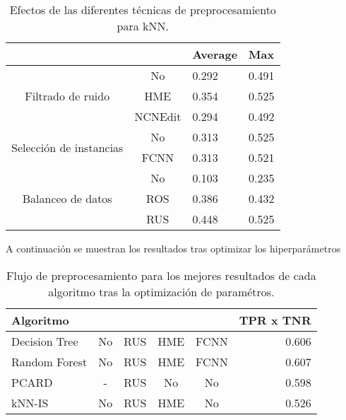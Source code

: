 \begin{table}[]
    \centering
    \begin{tabular}{cc|l|l|}
    \cline{3-4}
    \multicolumn{1}{l}{\textbf{}} & \textbf{} & \multicolumn{1}{c|}{\textbf{Average}} & \textbf{Max} \\ \hline
    \multicolumn{1}{|c|}{\multirow{3}{*}{Filtrado de ruido}}       & No        & 0.292    & 0.491    \\ \cline{2-4} 
    \multicolumn{1}{|c|}{}  & HME       & 0.354         & 0.525        \\ \cline{2-4} 
    \multicolumn{1}{|c|}{}  & NCNEdit   & 0.294         & 0.492        \\ \hline
    \multicolumn{1}{|c|}{\multirow{2}{*}{Selección de instancias}} & No        & 0.313         & 0.525        \\ \cline{2-4} 
    \multicolumn{1}{|c|}{}  & FCNN      & 0.313         & 0.521        \\ \hline
    \multicolumn{1}{|c|}{\multirow{3}{*}{Balanceo de datos}}       & No        & 0.103         & 0.235        \\ \cline{2-4} 
    \multicolumn{1}{|c|}{}  & ROS       & 0.386         & 0.432        \\ \cline{2-4} 
    \multicolumn{1}{|c|}{}  & RUS       & 0.448         & 0.525        \\ \hline
    \end{tabular}
    \caption{Efectos de las diferentes técnicas de preprocesamiento para kNN.}
\end{table}


A continuación se muestran los resultados tras optimizar los hiperparámetros

\begin{table}[]
    \centering
    \begin{tabular}{|l|c|c|c|c|r|}
    \hline
    \textbf{Algoritmo} & \textbf{} & \textbf{} &  &  & \textbf{TPR x TNR} \\ \hline
    Decision Tree      & No & RUS  & HME & FCNN  & 0.606 \\ \hline
    Random Forest      & No & RUS  & HME & FCNN  & 0.607 \\ \hline
    PCARD              & -  & RUS  & No  & No    & 0.598 \\ \hline
    kNN-IS             & No & RUS  & HME & No    & 0.526 \\ \hline
    \end{tabular}
    \caption{Flujo de preprocesamiento para los mejores resultados de cada algoritmo tras la optimización de paramétros.}
\end{table}